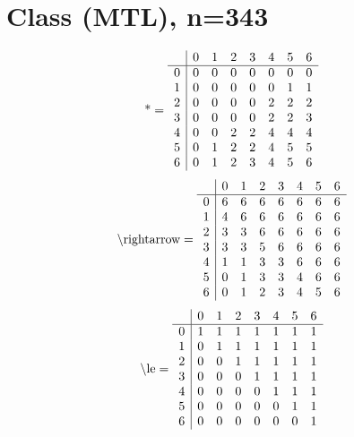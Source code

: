 \documentclass[11pt]{article}
\begin{document}
\section{Class (MTL), n=343}
\[\text{*} = 
\begin{array}{r | r r r r r r r}
 & 0 & 1 & 2 & 3 & 4 & 5 & 6 \\ \hline
0 & 0 & 0 & 0 & 0 & 0 & 0 & 0 \\
1 & 0 & 0 & 0 & 0 & 0 & 1 & 1 \\
2 & 0 & 0 & 0 & 0 & 2 & 2 & 2 \\
3 & 0 & 0 & 0 & 0 & 2 & 2 & 3 \\
4 & 0 & 0 & 2 & 2 & 4 & 4 & 4 \\
5 & 0 & 1 & 2 & 2 & 4 & 5 & 5 \\
6 & 0 & 1 & 2 & 3 & 4 & 5 & 6 \\
\end{array}
\]
\[\text{\textbackslash rightarrow} = 
\begin{array}{r | r r r r r r r}
 & 0 & 1 & 2 & 3 & 4 & 5 & 6 \\ \hline
0 & 6 & 6 & 6 & 6 & 6 & 6 & 6 \\
1 & 4 & 6 & 6 & 6 & 6 & 6 & 6 \\
2 & 3 & 3 & 6 & 6 & 6 & 6 & 6 \\
3 & 3 & 3 & 5 & 6 & 6 & 6 & 6 \\
4 & 1 & 1 & 3 & 3 & 6 & 6 & 6 \\
5 & 0 & 1 & 3 & 3 & 4 & 6 & 6 \\
6 & 0 & 1 & 2 & 3 & 4 & 5 & 6 \\
\end{array}
\]
\[\text{\textbackslash le} = 
\begin{array}{r | r r r r r r r}
 & 0 & 1 & 2 & 3 & 4 & 5 & 6 \\ \hline
0 & 1 & 1 & 1 & 1 & 1 & 1 & 1 \\
1 & 0 & 1 & 1 & 1 & 1 & 1 & 1 \\
2 & 0 & 0 & 1 & 1 & 1 & 1 & 1 \\
3 & 0 & 0 & 0 & 1 & 1 & 1 & 1 \\
4 & 0 & 0 & 0 & 0 & 1 & 1 & 1 \\
5 & 0 & 0 & 0 & 0 & 0 & 1 & 1 \\
6 & 0 & 0 & 0 & 0 & 0 & 0 & 1 \\
\end{array}
\]
\end{document}
